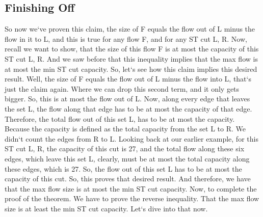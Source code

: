 \subsection{Finishing Off}
So now we`ve proven this claim, the size of F equals the flow out of L minus the flow in it to L, and this is true for any flow F, and for any ST cut L, R\@.
Now, recall we want to show, that the size of this flow F is at most the capacity of this ST cut L, R\@.
And we saw before that this inequality implies that the max flow is at most the min ST cut capacity.
So, let`s see how this claim implies this desired result.
Well, the size of F equals the flow out of L minus the flow into L, that`s just the claim again.
Where we can drop this second term, and it only gets bigger.
So, this is at most the flow out of L\@.
Now, along every edge that leaves the set L, the flow along that edge has to be at most the capacity of that edge.
Therefore, the total flow out of this set L, has to be at most the capacity.
Because the capacity is defined as the total capacity from the set L to R\@.
We didn`t count the edges from R to L\@.
Looking back at our earlier example, for this ST cut L, R, the capacity of this cut is 27, and the total flow along these six edges, which leave this set L, clearly, must be at most the total capacity along these edges, which is 27.
So, the flow out of this set L has to be at most the capacity of this cut.
So, this proves that desired result.
And therefore, we have that the max flow size is at most the min ST cut capacity.
Now, to complete the proof of the theorem.
We have to prove the reverse inequality.
That the max flow size is at least the min ST cut capacity.
Let`s dive into that now.

